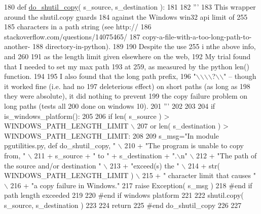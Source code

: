 \begin{DoxyCode}
180 \textcolor{keyword}{def }\hyperlink{namespacenegui_1_1pgutilities_a181f06e4657dd5c32806cca223f0eb4e}{do\_shutil\_copy}( s\_source, s\_destination ):
181 
182     \textcolor{stringliteral}{'''}
183 \textcolor{stringliteral}{    This wrapper around the shutil.copy guards}
184 \textcolor{stringliteral}{    against the Windows win32 api limit of 255}
185 \textcolor{stringliteral}{    characters in a path string (see http://}
186 \textcolor{stringliteral}{    stackoverflow.com/questions/14075465/}
187 \textcolor{stringliteral}{    copy-a-file-with-a-too-long-path-to-another-}
188 \textcolor{stringliteral}{    directory-in-python).  }
189 \textcolor{stringliteral}{    }
190 \textcolor{stringliteral}{    Despite the use 255 i nthe above info, and 260}
191 \textcolor{stringliteral}{    as the length limit given elsewhere on the web,}
192 \textcolor{stringliteral}{    My trial found that I needed to set my max path}
193 \textcolor{stringliteral}{    at 259, as measured by the python len() function.}
194 \textcolor{stringliteral}{}
195 \textcolor{stringliteral}{    I also found that the long path prefix, }
196 \textcolor{stringliteral}{    "\(\backslash\)\(\backslash\)\(\backslash\)\(\backslash\)?\(\backslash\)\(\backslash\)" -- though it worked fine (i.e. had no}
197 \textcolor{stringliteral}{    deleterious effect) on short paths (as long as}
198 \textcolor{stringliteral}{    they were absolute), it did nothing to prevent}
199 \textcolor{stringliteral}{    the copy failure problem on long paths (tests all}
200 \textcolor{stringliteral}{    done on windows 10).}
201 \textcolor{stringliteral}{    '''}
202 
203 
204     \textcolor{keywordflow}{if} is\_windows\_platform():
205 
206         \textcolor{keywordflow}{if} len( s\_source ) > WINDOWS\_PATH\_LENGTH\_LIMIT \(\backslash\)
207                 \textcolor{keywordflow}{or} len( s\_destination ) > WINDOWS\_PATH\_LENGTH\_LIMIT:
208 
209             s\_msg=\textcolor{stringliteral}{"In module pgutilities.py, def do\_shutil\_copy, "} \(\backslash\)
210                         + \textcolor{stringliteral}{"The program is unable to copy from, "} \(\backslash\)
211                         + s\_source + \textcolor{stringliteral}{" to "} + s\_destination + \textcolor{stringliteral}{".\(\backslash\)n"} \(\backslash\)
212                         + \textcolor{stringliteral}{"The path of the source and/or destination "} \(\backslash\)
213                         + \textcolor{stringliteral}{"exceed(s) the "} \(\backslash\)
214                         + str( WINDOWS\_PATH\_LENGTH\_LIMIT )  \(\backslash\)
215                         + \textcolor{stringliteral}{" character  limit that causes "} \(\backslash\)
216                         + \textcolor{stringliteral}{"a copy failure in Windows."}  
217             \textcolor{keywordflow}{raise} Exception( s\_msg )
218         \textcolor{comment}{#end if path length exceeded}
219         
220     \textcolor{comment}{#end if windows platform}
221 
222     shutil.copy( s\_source, s\_destination )
223 
224     \textcolor{keywordflow}{return}
225 \textcolor{comment}{#end do\_shutil\_copy}
226 
227 
\end{DoxyCode}
